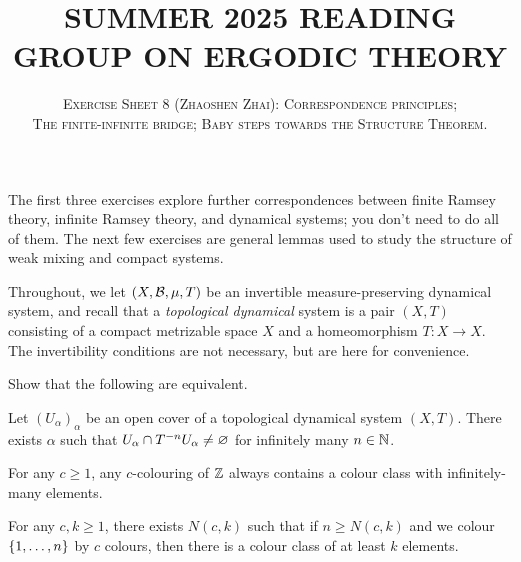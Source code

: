 \documentclass[reqno, twoside]{article}
\begin{document}
    \title{\textbf{\normalsize\MakeUppercase{Summer 2025 Reading Group on Ergodic Theory}}}
    \author{\normalsize\textsc{Exercise Sheet 8 (Zhaoshen Zhai): Correspondence principles;}\\\normalsize\textsc{The finite-infinite bridge; Baby steps towards the Structure Theorem.}}
    \date{}
    \maketitle

    The first three exercises explore further correspondences between finite Ramsey theory, infinite Ramsey theory, and dynamical systems; you don't need to do all of them. The next few exercises are general lemmas used to study the structure of weak mixing and compact systems.

    Throughout, we let $(X,\mathcal{B},\mu,T)$ be an invertible measure-preserving dynamical system, and recall that a \textit{topological dynamical} system is a pair $(X,T)$ consisting of a compact metrizable space $X$ and a homeomorphism $T:X\to X$. The invertibility conditions are not necessary, but are here for convenience.

    \begin{exercise}
        Show that the following are equivalent.
        \begin{center}
            \begin{minipage}{0.95\textwidth}
                \begin{theorem*}
                    Let $(U_\alpha)_\alpha$ be an open cover of a topological dynamical system $(X,T)$. There exists $\alpha$ such that $U_\alpha\cap T^{-n}U_\alpha\neq\varnothing$ for infinitely many $n\in\mathbb{N}$.
                \end{theorem*}
                \begin{theorem*}
                    For any $c\geq1$, any $c$-colouring of $\mathbb{Z}$ always contains a colour class with infinitely-many elements.
                \end{theorem*}
                \begin{theorem*}
                    For any $c,k\geq1$, there exists $N(c,k)$ such that if $n\geq N(c,k)$ and we colour $\left\{1,\dots,n\right\}$ by $c$ colours, then there is a colour class of at least $k$ elements.
                \end{theorem*}
            \end{minipage}
        \end{center}
    \end{exercise}
\end{document}
